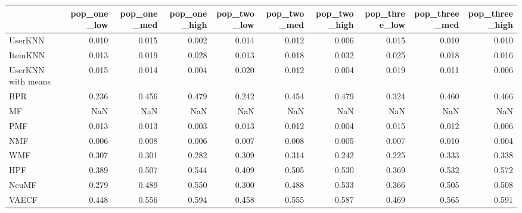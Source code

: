 \begin{tabular}{lrrrrrrrrr}
\toprule
{} &  pop\_one\_low &  pop\_one\_med &  pop\_one\_high &  pop\_two\_low &  pop\_two\_med &  pop\_two\_high &  pop\_three\_low &  pop\_three\_med &  pop\_three\_high \\
\midrule
UserKNN            &        0.010 &        0.015 &         0.002 &        0.014 &        0.012 &         0.006 &          0.015 &          0.010 &           0.010 \\
ItemKNN            &        0.013 &        0.019 &         0.028 &        0.013 &        0.018 &         0.032 &          0.025 &          0.018 &           0.016 \\
UserKNN with means &        0.015 &        0.014 &         0.004 &        0.020 &        0.012 &         0.004 &          0.019 &          0.011 &           0.006 \\
BPR                &        0.236 &        0.456 &         0.479 &        0.242 &        0.454 &         0.479 &          0.324 &          0.460 &           0.466 \\
MF                 &          NaN &          NaN &           NaN &          NaN &          NaN &           NaN &            NaN &            NaN &             NaN \\
PMF                &        0.013 &        0.013 &         0.003 &        0.013 &        0.012 &         0.004 &          0.015 &          0.012 &           0.006 \\
NMF                &        0.006 &        0.008 &         0.006 &        0.007 &        0.008 &         0.005 &          0.007 &          0.010 &           0.004 \\
WMF                &        0.307 &        0.301 &         0.282 &        0.309 &        0.314 &         0.242 &          0.225 &          0.333 &           0.338 \\
HPF                &        0.389 &        0.507 &         0.544 &        0.409 &        0.505 &         0.530 &          0.369 &          0.532 &           0.572 \\
NeuMF              &        0.279 &        0.489 &         0.550 &        0.300 &        0.488 &         0.533 &          0.366 &          0.505 &           0.508 \\
VAECF              &        0.448 &        0.556 &         0.594 &        0.458 &        0.555 &         0.587 &          0.469 &          0.565 &           0.591 \\
\bottomrule
\end{tabular}
